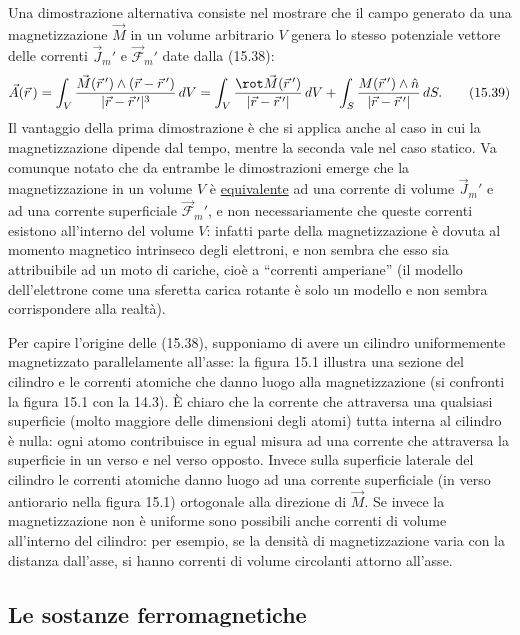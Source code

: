 Una dimostrazione alternativa consiste nel mostrare che il campo generato da una
magnetizzazione $\vec M$ in un volume arbitrario $V$ genera lo stesso potenziale
vettore delle correnti $\vec J_m'$ e $\vec{\mathcal F}_m'$ date dalla (15.38):
\begin{equation}
  \vec A(\vec r\,)=\int_V\frac{\vec M(\vec r\,')\wedge(\vec r-\vec r\,')}
  {|\vec r-\vec r\,'|^3}\,dV
  =\int_V\frac{\rot\vec M(\vec r\,')}{|\vec r-\vec r\,'|}\,dV
  +\int_S\frac{M(\vec r\,')\wedge\hat n}{|\vec r-\vec r\,'|}\,dS.
  \tag{15.39}
\end{equation}
Il vantaggio della prima dimostrazione \`e che si applica anche al caso in cui
la magnetizzazione dipende dal tempo, mentre la seconda vale nel caso statico.
Va comunque notato che da entrambe le dimostrazioni emerge che la
magnetizzazione in un volume $V$ \`e \underline{equivalente} ad una corrente di
volume $\vec J_m'$ e ad una corrente superficiale $\vec{\mathcal F}_m'$, e non
necessariamente che queste correnti esistono all'interno del volume $V$: infatti
parte della magnetizzazione \`e dovuta al momento magnetico intrinseco degli
elettroni, e non sembra che esso sia attribuibile ad un moto di cariche, cio\`e
a ``correnti amperiane'' (il modello dell'elettrone come una sferetta carica
rotante \`e solo un modello e non sembra corrispondere alla realt\`a).

Per capire l'origine delle (15.38), supponiamo di avere un cilindro
uniformemente magnetizzato parallelamente all'asse: la figura 15.1 illustra una
sezione del cilindro e le correnti atomiche che danno luogo alla magnetizzazione
(si confronti la figura 15.1 con la 14.3). \`E chiaro che la corrente che
attraversa una qualsiasi superficie (molto maggiore delle dimensioni degli
atomi) tutta interna al cilindro \`e nulla: ogni atomo contribuisce in egual
misura ad una corrente che attraversa la superficie in un verso e nel verso
opposto. Invece sulla superficie laterale del cilindro le correnti atomiche
danno luogo ad una corrente superficiale (in verso antiorario nella figura 15.1)
ortogonale alla direzione di $\vec M$. Se invece la magnetizzazione non \`e
uniforme sono possibili anche correnti di volume all'interno del cilindro: per
esempio, se la densit\`a di magnetizzazione varia con la distanza dall'asse, si
hanno correnti di volume circolanti attorno all'asse.

\subsection{Le sostanze ferromagnetiche}

